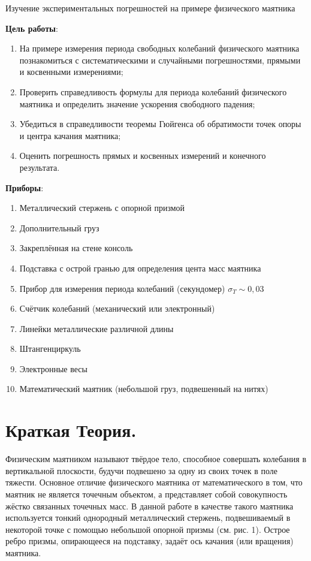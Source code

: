 \documentclass[a4paper,12pt]{article} %
\begin{document}
 {Изучение экспериментальных погрешностей на примере физического маятника}

\textbf{Цель работы}:
\begin{enumerate}
\item На примере измерения периода свободных колебаний физического маятника познакомиться с систематическими и случайными погрешностями, прямыми и косвенными измерениями;
\item Проверить справедливость формулы для периода колебаний физического маятника и определить значение ускорения свободного падения;
\item Убедиться в справедливости теоремы Гюйгенса об обратимости точек опоры и центра качания маятника;
\item Оценить погрешность прямых и косвенных измерений и конечного результата.
\end{enumerate}

\textbf{Приборы}:
\begin{enumerate}
\item Металлический стержень с опорной призмой
\item Дополнительный груз
\item Закреплённая на стене консоль
\item Подставка с острой гранью для определения цента масс маятника
\item Прибор для измерения периода колебаний (секундомер) $ \sigma_T \sim 0,03 $
\item Счётчик колебаний (механический или электронный)
\item Линейки металлические различной длины
\item Штангенциркуль
\item Электронные весы
\item Математический маятник (небольшой груз, подвешенный на нитях)
\end{enumerate}

\section{Краткая Теория.}

Физическим маятником называют твёрдое тело, способное совершать колебания в вертикальной плоскости, будучи подвешено за одну из своих точек в поле тяжести. Основное отличие физического маятника от математического в том, что маятник не является точечным объектом,
а представляет собой совокупность жёстко связанных точечных масс. В данной работе в качестве такого маятника используется тонкий однородный металлический стержень, подвешиваемый в некоторой точке с помощью небольшой опорной призмы (см. рис. 1). Острое ребро
призмы, опирающееся на подставку, задаёт ось качания (или вращения) маятника.
\end{document}
